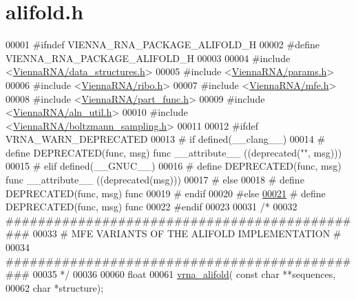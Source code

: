 \hypertarget{alifold_8h_source}{}\section{alifold.\+h}
\label{alifold_8h_source}

\begin{DoxyCode}
00001 \textcolor{preprocessor}{#ifndef VIENNA\_RNA\_PACKAGE\_ALIFOLD\_H}
00002 \textcolor{preprocessor}{#define VIENNA\_RNA\_PACKAGE\_ALIFOLD\_H}
00003 
00004 \textcolor{preprocessor}{#include <\mbox{\hyperlink{data__structures_8h}{ViennaRNA/data\_structures.h}}>}
00005 \textcolor{preprocessor}{#include <\mbox{\hyperlink{params_8h}{ViennaRNA/params.h}}>}
00006 \textcolor{preprocessor}{#include <\mbox{\hyperlink{ribo_8h}{ViennaRNA/ribo.h}}>}
00007 \textcolor{preprocessor}{#include <\mbox{\hyperlink{mfe_8h}{ViennaRNA/mfe.h}}>}
00008 \textcolor{preprocessor}{#include <\mbox{\hyperlink{part__func_8h}{ViennaRNA/part\_func.h}}>}
00009 \textcolor{preprocessor}{#include <\mbox{\hyperlink{aln__util_8h}{ViennaRNA/aln\_util.h}}>}
00010 \textcolor{preprocessor}{#include <\mbox{\hyperlink{boltzmann__sampling_8h}{ViennaRNA/boltzmann\_sampling.h}}>}
00011 
00012 \textcolor{preprocessor}{#ifdef VRNA\_WARN\_DEPRECATED}
00013 \textcolor{preprocessor}{# if defined(\_\_clang\_\_)}
00014 \textcolor{preprocessor}{#  define DEPRECATED(func, msg) func \_\_attribute\_\_ ((deprecated("", msg)))}
00015 \textcolor{preprocessor}{# elif defined(\_\_GNUC\_\_)}
00016 \textcolor{preprocessor}{#  define DEPRECATED(func, msg) func \_\_attribute\_\_ ((deprecated(msg)))}
00017 \textcolor{preprocessor}{# else}
00018 \textcolor{preprocessor}{#  define DEPRECATED(func, msg) func}
00019 \textcolor{preprocessor}{# endif}
00020 \textcolor{preprocessor}{#else}
\mbox{\hyperlink{alifold_8h_aab347a3c03fbe8e7319551b9fa0cce4a}{00021}} \textcolor{preprocessor}{# define DEPRECATED(func, msg) func}
00022 \textcolor{preprocessor}{#endif}
00023 
00031 \textcolor{comment}{/*}
00032 \textcolor{comment}{##############################################}
00033 \textcolor{comment}{# MFE VARIANTS OF THE ALIFOLD IMPLEMENTATION #}
00034 \textcolor{comment}{##############################################}
00035 \textcolor{comment}{*/}
00036 
00060 \textcolor{keywordtype}{float}
00061 \mbox{\hyperlink{group__consensus__mfe__fold_ga6c9d3bef3e92c6d423ffac9f981418c1}{vrna\_alifold}}( \textcolor{keyword}{const} \textcolor{keywordtype}{char} **sequences,
00062               \textcolor{keywordtype}{char} *structure);

\end{DoxyCode}
